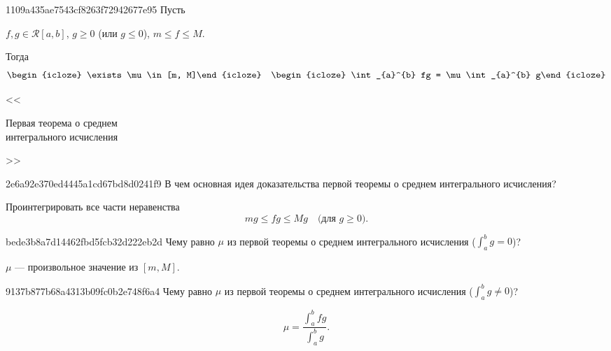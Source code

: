\begin{note}{1109a435ae7543cf8263f72942677e95}
    Пусть \begin{icloze}{2}\({ f, g \in \mathcal R[a, b] }\), \({ g \geqslant 0 }\) (или \({ g \leqslant 0 }\)), \({ m \leqslant f \leqslant M }\).\end{icloze}
    Тогда
    \[
        \begin{icloze}{4}\exists \mu \in [m, M]\end{icloze} \quad \begin{icloze}{1}\int_{a}^{b} fg = \mu \int_{a}^{b} g\end{icloze}
    \]

    \begin{center}
        \tiny
        <<\begin{icloze}{3}Первая теорема о среднем \\\phantom{<<}интегрального исчисления\end{icloze}>>
    \end{center}
\end{note}

\begin{note}{2e6a92e370ed4445a1cd67bd8d0241f9}
    В чем основная идея доказательства первой теоремы о среднем интегрального исчисления?

    \begin{cloze}{1}
        Проинтегрировать все части неравенства
        \[
            mg \leqslant fg \leqslant Mg \quad \text{(для \({ g \geqslant 0 }\))}.
        \]
    \end{cloze}
\end{note}

\begin{note}{bede3b8a7d14462fbd5fcb32d222eb2d}
    Чему равно \({ \mu }\) из первой теоремы о среднем интегрального исчисления (\({ \int_{a}^{b} g = 0 }\))?

    \begin{cloze}{1}
        \({ \mu }\) --- произвольное значение из \({ [m, M] }\).
    \end{cloze}
\end{note}

\begin{note}{9137b877b68a4313b09fc0b2e748f6a4}
    Чему равно \({ \mu }\) из первой теоремы о среднем интегрального исчисления (\({ \int_{a}^{b} g \neq 0 }\))?

    \begin{cloze}{1}
        \[
            \mu = \frac{\int_{a}^{b} fg}{\int_{a}^{b} g}.
        \]
    \end{cloze}
\end{note}

